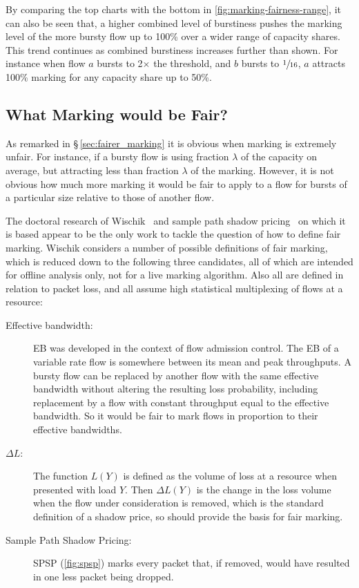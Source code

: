 By comparing the top charts with the bottom in \autoref{fig:marking-fairness-range}, it can also be seen that, a higher combined level of burstiness pushes the marking level of the more bursty flow up to 100\% over a wider range of capacity shares. This trend continues as combined burstiness increases further than shown. For instance when flow \(a\) bursts to 2\(\times\) the threshold, and \(b\) bursts to \(\sfrac{1}{16}\), \(a\) attracts 100\% marking for any capacity share up to 50\%.

\subsection{What Marking would be Fair?}\label{sec:marking_fairness_definition}

As remarked in \S\,\ref{sec:fairer_marking} it is obvious when marking is extremely unfair. For instance, if a bursty flow is using fraction \(\lambda\) of the capacity on average, but attracting less than fraction \(\lambda\) of the marking. However, it is not obvious how much more marking it would be fair to apply to a flow for bursts of a particular size relative to those of another flow.

The doctoral research of Wischik~\cite{Wischik99:Mark_Fairly, Wischik99:Large_Dev_PhD} and sample path shadow pricing~\cite{Kelly98:Shadow_prices_prop_fair} on which it is based appear to be the only work to tackle the question of how to define fair marking. Wischik considers a number of possible definitions of fair marking, which is reduced down to the following three candidates, all of which are intended for offline analysis only, not for a live marking algorithm. Also all are defined in relation to packet loss, and all assume high statistical multiplexing of flows at a resource:
\begin{description}
	\item[Effective bandwidth:] EB was developed in the context of flow admission control. The EB of a variable rate flow is somewhere between its mean and peak throughputs. A bursty flow can be replaced by another flow with the same effective bandwidth without altering the resulting loss probability, including replacement by a flow with constant throughput equal to the effective bandwidth. So it would be fair to mark flows in proportion to their effective bandwidths.
	\item[\boldmath\(\Delta{L}\):] The function \(L(Y)\) is defined as the volume of loss at a resource when presented with load \(Y\). Then \(\Delta{L(Y)}\) is the change in the loss volume when the flow under consideration is removed, which is the standard definition of a shadow price, so should provide the basis for fair marking. 
	\item[Sample Path Shadow Pricing:] SPSP (\autoref{fig:spsp}) marks every packet that, if removed, would have resulted in one less packet being dropped.
\end{description}

